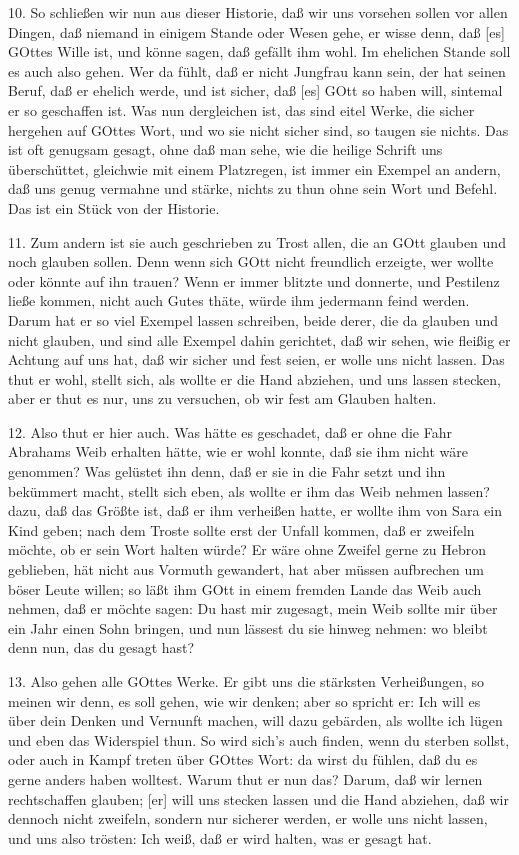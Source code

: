 10. So schließen wir nun aus dieser Historie, daß wir uns vorsehen sollen vor allen Dingen, daß niemand in einigem Stande oder Wesen gehe, er wisse denn, daß [es] GOttes Wille ist, und könne sagen, daß gefällt ihm wohl. Im ehelichen Stande soll es auch also gehen. Wer da fühlt, daß er nicht Jungfrau kann sein, der hat seinen Beruf, daß er ehelich werde, und ist sicher, daß [es] GOtt so haben will, sintemal er so geschaffen ist. Was nun dergleichen ist, das sind eitel Werke, die sicher hergehen auf GOttes Wort, und wo sie nicht sicher sind, so taugen sie nichts. Das ist oft genugsam gesagt, ohne daß man sehe, wie die heilige Schrift uns überschüttet, gleichwie mit einem Platzregen, ist immer ein Exempel an andern, daß uns genug vermahne und stärke, nichts zu thun ohne sein Wort und Befehl. Das ist ein Stück von der Historie.

11. Zum andern ist sie auch geschrieben zu Trost allen, die an GOtt glauben und noch glauben sollen. Denn wenn sich GOtt nicht freundlich erzeigte, wer wollte oder könnte auf ihn trauen? Wenn er immer blitzte und donnerte, und Pestilenz ließe kommen, nicht auch Gutes thäte, würde ihm jedermann feind werden. Darum hat er so viel Exempel lassen schreiben, beide derer, die da glauben und nicht glauben, und sind alle Exempel dahin gerichtet, daß wir sehen, wie fleißig er Achtung auf uns hat, daß wir sicher und fest seien, er wolle uns nicht lassen. Das thut er wohl, stellt sich, als wollte er die Hand abziehen, und uns lassen stecken, aber er thut es nur, uns zu versuchen, ob wir fest am Glauben halten.

12. Also thut er hier auch. Was hätte es geschadet, daß er ohne die Fahr Abrahams Weib erhalten hätte, wie er wohl konnte, daß sie ihm nicht wäre genommen? Was gelüstet ihn denn, daß er sie in die Fahr setzt und ihn bekümmert macht, stellt sich eben, als wollte er ihm das Weib nehmen lassen? dazu, daß das Größte ist, daß er ihm verheißen hatte, er wollte ihm von Sara ein Kind geben; nach dem Troste sollte erst der Unfall kommen, daß er zweifeln möchte, ob er sein Wort halten würde? Er wäre ohne Zweifel gerne zu Hebron geblieben, hät nicht aus Vormuth gewandert, hat aber müssen aufbrechen um böser Leute willen; so läßt ihm GOtt in einem fremden Lande das Weib auch nehmen, daß er möchte sagen: Du hast mir zugesagt, mein Weib sollte mir über ein Jahr einen Sohn bringen, und nun lässest du sie hinweg nehmen: wo bleibt denn nun, das du gesagt hast?

13. Also gehen alle GOttes Werke. Er gibt uns die stärksten Verheißungen, so meinen wir denn, es soll gehen, wie wir denken; aber so spricht er: Ich will es über dein Denken und
Vernunft machen, will dazu gebärden, als wollte ich lügen und eben das Widerspiel thun. So wird sich’s auch finden, wenn du sterben sollst, oder auch in Kampf treten über GOttes Wort: da wirst du fühlen, daß du es gerne anders haben wolltest. Warum thut er nun das? Darum, daß wir lernen rechtschaffen glauben; [er] will uns stecken lassen und die Hand abziehen, daß wir dennoch nicht zweifeln, sondern nur sicherer werden, er wolle uns nicht lassen, und uns also trösten: Ich weiß, daß er wird halten, was er gesagt hat.

